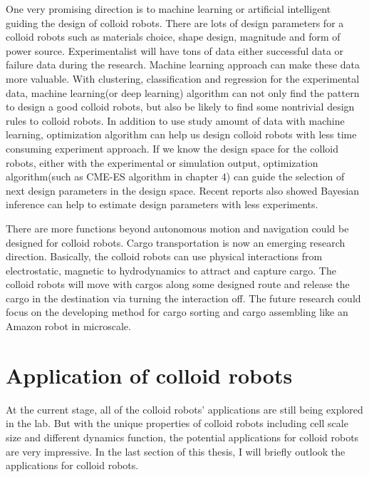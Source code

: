 One very promising  direction is to machine learning or artificial intelligent guiding the design of colloid robots. There are lots of design parameters for a colloid robots such as materials choice, shape design, magnitude and form of power source. Experimentalist will have tons of data  either successful data or failure data during the research. Machine learning approach can make these data more valuable. With clustering, classification and regression for the experimental data, machine learning(or deep learning) algorithm can not only find the pattern to design a good colloid robots, but also be likely to find some nontrivial design rules to colloid robots. In addition to use study amount of data with machine learning, optimization algorithm can help us design colloid robots with less time consuming experiment approach. If we know the design space for the colloid robots, either with the experimental or simulation output, optimization algorithm(such as CME-ES algorithm in chapter 4) can guide the selection of next design parameters in the design space. Recent reports also showed Bayesian inference can help to estimate design parameters with less experiments. \cite{winslow2019characterization}



There are more functions beyond autonomous motion and navigation could be designed for colloid robots. Cargo transportation is now an emerging research direction.\cite{demirors2018active,Martinez-Pedrero2015} Basically, the colloid robots can use physical interactions from electrostatic, magnetic to hydrodynamics to attract and capture cargo. The colloid robots will move with cargos along some designed route and release the cargo in the destination via turning the interaction off. The future research could focus  on the developing method for cargo sorting and cargo assembling like an Amazon robot in microscale.


\section{Application of colloid robots}
At the current stage, all of the colloid robots' applications are still being explored in the lab. But with the unique properties of colloid robots including cell scale size and different dynamics function, the potential applications for colloid robots are very impressive. In the last section of this thesis, I will briefly outlook the applications for colloid robots.

